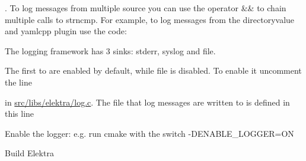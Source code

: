 \begin{DoxyCode}{0}
\DoxyCodeLine{\textcolor{preprocessor}{\#ifndef NO\_FILTER}}
\DoxyCodeLine{\textcolor{preprocessor}{\#endif}}
\end{DoxyCode}


. To log messages from multiple source you can use the operator {\ttfamily \&\&} to chain multiple calls to {\ttfamily strncmp}. For example, to log messages from the {\ttfamily directoryvalue} and {\ttfamily yamlcpp} plugin use the code\+:


\begin{DoxyCode}{0}
\DoxyCodeLine{\textcolor{preprocessor}{\#ifndef NO\_FILTER}}
\DoxyCodeLine{\textcolor{preprocessor}{\#endif}}
\end{DoxyCode}


The logging framework has 3 sinks\+: stderr, syslog and file.

The first to are enabled by default, while file is disabled. To enable it uncomment the line


\begin{DoxyCode}{0}
\DoxyCodeLine{\textcolor{comment}{// \#define USE\_FILE\_SINK}}
\end{DoxyCode}


in {\ttfamily \mbox{\hyperlink{log_8c}{src/libs/elektra/log.\+c}}}. The file that log messages are written to is defined in this line


\begin{DoxyCode}{0}
\end{DoxyCode}



\begin{DoxyEnumerate}
\item Enable the logger\+: e.\+g. run {\ttfamily cmake} with the switch {\ttfamily -\/D\+E\+N\+A\+B\+L\+E\+\_\+\+L\+O\+G\+G\+ER=ON}
\item Build Elektra
\end{DoxyEnumerate}


